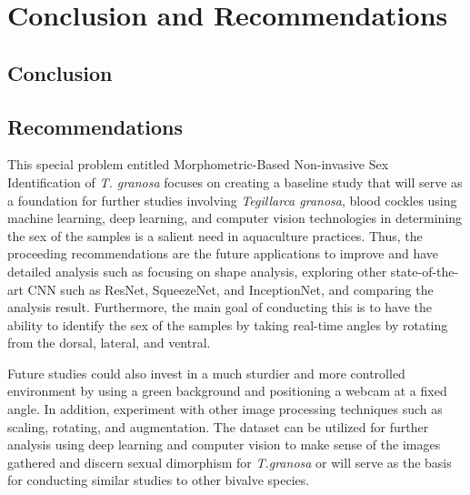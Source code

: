 \chapter{Conclusion and Recommendations}


\section{Conclusion}


\section{Recommendations}

This special problem entitled Morphometric-Based Non-invasive Sex Identification of \textit{T. granosa} focuses on creating a baseline study that will serve as a foundation for further studies involving \textit{Tegillarca granosa}, blood cockles using machine learning, deep learning, and computer vision technologies in determining the sex of the samples is a salient need in aquaculture practices. Thus, the proceeding recommendations are the future applications to improve and have detailed analysis such as focusing on shape analysis, exploring other state-of-the-art CNN such as ResNet, SqueezeNet, and InceptionNet, and comparing the analysis result. Furthermore, the main goal of conducting this is to have the ability to identify the sex of the samples by taking real-time angles by rotating from the dorsal, lateral, and ventral. 

Future studies could also invest in a much sturdier and more controlled environment by using a green background and positioning a webcam at a fixed angle. In addition, experiment with other image processing techniques such as scaling, rotating, and augmentation. The dataset can be utilized for further analysis using deep learning and computer vision to make sense of the images gathered and discern sexual dimorphism for \textit{T.granosa} or will serve as the basis for conducting similar studies to other bivalve species. 





